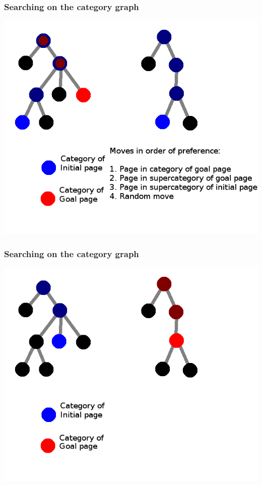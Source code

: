 \documentclass{beamer}
\begin{document}
\begin{frame}
\frametitle{Searching on the category graph}
  \includegraphics[height=0.8\textheight]{img/cats-4a.png}
\end{frame}
\begin{frame}
\frametitle{Searching on the category graph}
  \includegraphics[height=0.8\textheight]{img/cats-3b.png}
\end{frame}
\end{document}
